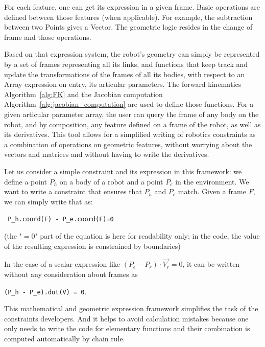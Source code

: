 For each feature, one can get its expression in a given frame.
Basic operations are defined between those features (when applicable).
For example, the subtraction between two Points gives a Vector.
The geometric logic resides in the change of frame and those operations.

Based on that expression system, the robot's geometry can simply be represented by a set of frames representing all its links, and functions that keep track and update the transformations of the frames of all its bodies, with respect to an Array expression on entry, its articular parameters.
The forward kinematics Algorithm~\ref{alg:FK} and the Jacobian computation Algorithm~\ref{alg:jacobian_computation} are used to define those functions.
For a given articular parameter array, the user can query the frame of any body on the robot, and by composition, any feature defined on a frame of the robot, as well as its derivatives.
This tool allows for a simplified writing of robotics constraints as a combination of operations on geometric features, without worrying about the vectors and matrices and without having to write the derivatives.

Let us consider a simple constraint and its expression in this framework:
we define a point $P_h$ on a body of a robot and a point $P_e$ in the environment.
We want to write a constraint that ensures that $P_h$ and $P_e$ match.
Given a frame $F$, we can simply write that as:
\begin{center}
\tt{ P\_h.coord(F) - P\_e.coord(F)=0}
\end{center}
(the "$=0$" part of the equation is here for readability only; in the code, the value of the resulting expression is constrained by boundaries)

In the case of a scalar expression like $(P_e - P_r)\cdot \overrightarrow{V_r} = 0$, it can be written without any consideration about frames as
\begin{center}
{\tt(P\_h - P\_e).dot(V) = 0}.
\end{center}

This mathematical and geometric expression framework simplifies the task of the constraints developers.
And it helps to avoid calculation mistakes because one only needs to write the code for elementary functions and their combination is computed automatically by chain rule.


